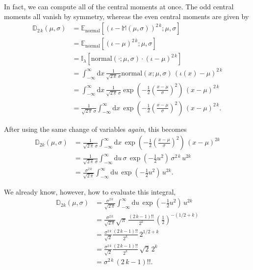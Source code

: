 \documentclass[
  letterpaper,
  DIV=11,
  numbers=noendperiod]{scrartcl}
\begin{document}
In fact, we can compute all of the central moments at once. The odd
central moments all vanish by symmetry, whereas the even central moments
are given by \begin{align*}
\mathbb{D}_{2 \, k}(\mu, \sigma)
&=
\mathbb{E}_{\mathrm{normal}}
[ \left( \iota - \mathbb{M}(\mu, \sigma) \right)^{2 \, k} ; \mu, \sigma ]
\\
&=
\mathbb{E}_{\mathrm{normal}}
[ \left( \iota - \mu \right)^{2 \,k} ; \mu, \sigma ]
\\
&=
\mathbb{I}_{\lambda}
[\mathrm{normal}(\cdot; \mu, \sigma) \cdot \left( \iota - \mu \right)^{2 \, k} ]
\\
&=
\int_{-\infty}^{\infty} \mathrm{d} x \,
\frac{1}{\sqrt{2 \, \pi} \, \sigma}
\mathrm{normal}(x; \mu, \sigma) \,
\left( \iota(x) - \mu \right)^{2 \,k}
\\
&=
\int_{-\infty}^{\infty} \mathrm{d} x \,
\frac{1}{\sqrt{2 \, \pi} \, \sigma}
\exp \left(
  -\frac{1}{2} \left( \frac{x - \mu}{\sigma} \right)^{2}
\right) \,
\left( x - \mu \right)^{2 \,k}
\\
&=
\frac{1}{\sqrt{2 \, \pi} \, \sigma}
\int_{-\infty}^{\infty} \mathrm{d} x \,
\exp \left(
  -\frac{1}{2} \left( \frac{x - \mu}{\sigma} \right)^{2}
\right) \,
\left( x - \mu \right)^{2 \,k}.
\end{align*}

After using the same change of variables \emph{again}, this becomes
\begin{align*}
\mathbb{D}_{2 k}(\mu, \sigma)
&=
\frac{1}{\sqrt{2 \, \pi} \, \sigma}
\int_{-\infty}^{\infty} \mathrm{d} x \,
\exp \left(
  -\frac{1}{2} \left( \frac{x - \mu}{\sigma} \right)^{2}
\right) \,
\left( x - \mu \right)^{2 k}
\\
&=
\frac{1}{\sqrt{2 \, \pi} \, \sigma}
\int_{-\infty}^{\infty} \mathrm{d} u \, \sigma \,
\exp \left( -\frac{1}{2} u^{2} \right) \,
\sigma^{2 \, k} \, u^{2 k}
\\
&=
\frac{\sigma^{2 \, k} }{\sqrt{2 \, \pi}}
\int_{-\infty}^{\infty} \mathrm{d} u \,
\exp \left( -\frac{1}{2} u^{2} \right) \, u^{2 k}.
\end{align*}

We already know, however, how to evaluate this integral, \begin{align*}
\mathbb{D}_{2 k}(\mu, \sigma)
&=
\frac{\sigma^{2 \, k} }{\sqrt{2 \, \pi}}
\int_{-\infty}^{\infty} \mathrm{d} u \,
\exp \left( -\frac{1}{2} u^{2} \right) \, u^{2 k}
\\
&=
\frac{\sigma^{2 \, k} }{\sqrt{2 \, \pi}}
\sqrt{\pi} \, \frac{ (2 \, k - 1)!! }{2^{k}} \,
\left( \frac{1}{2} \right)^{-(1/2 + k)}
\\
&=
\frac{\sigma^{2 \, k} }{\sqrt{2}}
\frac{ (2 \, k - 1)!! }{2^{k}} \,
2^{1/2 + k}
\\
&=
\frac{\sigma^{2 \, k} }{\sqrt{2}}
\frac{ (2 \, k - 1)!! }{2^{k}} \,
\sqrt{2} \, 2^{k}
\\
&=
\sigma^{2 \, k} \, (2 \, k - 1)!!.
\end{align*}
\end{document}
